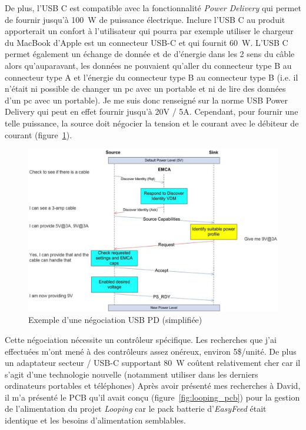 \documentclass[a4paper, 12pt, sffamily]{report}
\begin{document}
De plus, l’USB C est compatible avec la fonctionnalité \emph{Power Delivery} qui permet de fournir jusqu’à \SI{100}{\watt} de puissance électrique. Inclure l’USB C au produit apporterait un confort à l’utilisateur qui pourra par exemple utiliser le chargeur du MacBook d’Apple est un connecteur USB-C et qui fournit \SI{60}{\watt}.
L'USB C permet également un échange de donnée et de d'énergie dans les 2 sens du câble alors qu'auparavant, les données ne pouvaient qu'aller du connecteur type B au connecteur type A et l'énergie du connecteur type B au connecteur type B (i.e. il n'était ni possible de changer un pc avec un portable et ni de lire des données d'un pc avec un portable).
Je me suis donc renseigné sur la norme USB Power Delivery qui peut en effet fournir jusqu’à 20V / 5A. Cependant, pour fournir une telle puissance, la source doit négocier la tension et le courant avec le débiteur de courant (figure~\ref{fig:usb_pd_negociation}).

\begin{figure}[H]
\centering
\includegraphics[scale=0.35]{figures/screenshots/usb_pd_nego.png}
\caption{Exemple d’une négociation USB PD (simplifiée) \cite{usb_pd_nego}}
\label{fig:usb_pd_negociation}
\end{figure}

Cette négociation nécessite un contrôleur spécifique. Les recherches que j’ai effectuées m’ont mené à des contrôleurs assez onéreux, environ 5\$/unité. De plus un adaptateur secteur / USB-C supportant \SI{80}{\watt} coûtent relativement cher car il s'agit d'une technologie nouvelle (notamment utiliser dans les derniers ordinateurs portables et téléphones)
Après avoir présenté mes recherches à David, il m'a présenté le PCB qu’il avait conçu (figure~\ref{fig:looping_pcb}) pour la gestion de l’alimentation du projet \emph{Looping} car le pack batterie d'\emph{EasyFeed} était identique et les besoins d'alimentation semblables.
\end{document}
